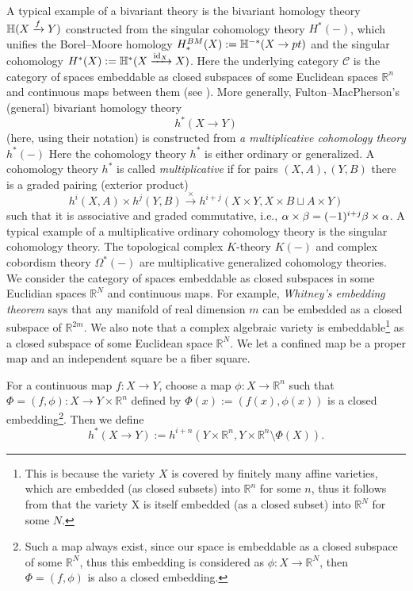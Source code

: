 \documentclass[a4paper]{amsart}
\begin{document}
A typical example of a bivariant theory is the bivariant homology theory $\mathbb H(X \xrightarrow f Y)$ 
constructed from the singular cohomology theory $H^*(-)$, which unifies the Borel--Moore homology $H_*^{BM}(X):=\mathbb H^{-*}(X \to pt)$ and the singular cohomology $H^*(X):=\mathbb H^*(X \xrightarrow {\operatorname{id}_X} X)$. Here the underlying category $\mathscr C$ is the category of spaces embeddable as closed subspaces of some Euclidean spaces $\mathbb R^n$ and continuous maps between them (see \cite[\S 3 Topological Theories]{FM}).
More generally, Fulton--MacPherson's (general) bivariant homology theory 
$$h^*(X \to Y)$$
(here, using their notation) 
is constructed from \emph{a multiplicative cohomology theory $h^*(-)$} \cite[\S 3.1]{FM}
Here the cohomology theory $h^*$ is either ordinary or generalized. 
A cohomology theory $h^*$ is called \emph{multiplicative} if for pairs $(X,A), (Y,B)$ there is a graded pairing (exterior product)
$$h^i(X,A) \times h^j(Y,B) \xrightarrow {\times} h^{i+j}(X \times Y, X \times B \sqcup A \times Y)$$
such that it is associative and graded commutative, i.e., $\alpha \times \beta = (-1)^{i+j} \beta \times \alpha$.
A typical example of a multiplicative ordinary cohomology theory is the singular cohomology theory. The topological complex $K$-theory $K(-)$ and complex cobordism theory $\Omega^*(-)$ are  multiplicative generalized  cohomology theories. We consider the category of spaces embeddable as closed subspaces in some Euclidian spaces $\mathbb R^N$ and continuous maps. For example, \emph{Whitney's embedding theorem} says that any manifold of real dimension $m$ can be embedded as a closed subspace of $\mathbb R^{2m}$. We also note that a complex algebraic variety is embeddable\footnote{This is because the variety $X$ is covered by finitely many affine varieties, which are embedded (as closed subsets) into $\mathbb R^n$ for some $n$, thus it follows from \cite[\S 8.8 Proposition]{Dold} that the variety X is itself embedded (as a closed subset) into $\mathbb R^N$ for some $N$. }  as a closed subspace of some Euclidean space $\mathbb R^N$. We let a confined map be a proper map and an independent square be a fiber square.
\begin{def}\label{biv-hom}
For a continuous map $f:X \to Y$, choose a map $\phi: X \to \mathbb R^n$ such that $\Phi=(f, \phi): X \to Y \times \mathbb R^n$ defined by $\Phi(x):=(f(x), \phi(x))$ is  a closed embedding\footnote{ Such a map always exist, since our space is embeddable as a closed subspace of some $\mathbb R^N$, thus this embedding is considered as $\phi:X \to \mathbb R^N$, then $\Phi=(f, \phi)$ is also a closed embedding.}. Then we define
\begin{equation}\label{embed}
h^*(X \to Y):= h^{i+n}(Y \times \mathbb R^n, Y \times \mathbb R^n \setminus \Phi(X)).
\end{equation}
\end{def}
\end{document}

